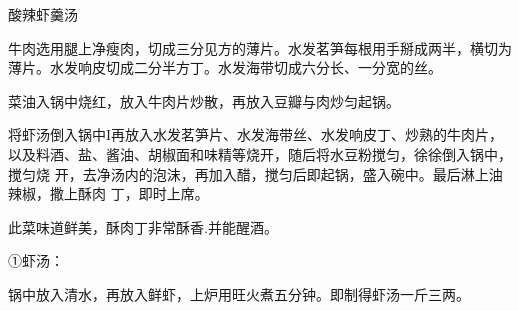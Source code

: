 \begin{recipe}{酸辣虾羹汤}

\ingredients


\cooking

\step 牛肉选用腿上净瘦肉，切成三分见方的薄片。水发茗笋每根用手掰成两半，横切为
薄片。水发响皮切成二分半方丁。水发海带切成六分长、一分宽的丝。

\step 菜油入锅中烧红，放入牛肉片炒散，再放入豆瓣与肉炒匀起锅。

\step 将虾汤倒入锅中I再放入水发茗笋片、水发海带丝、水发响皮丁、炒熟的牛肉片，
以及料酒、盐、酱油、胡椒面和味精等烧开，随后将水豆粉搅匀，徐徐倒入锅中，搅匀烧
开，去净汤内的泡沫，再加入醋，搅匀后即起锅，盛入碗中。最后淋上油辣椒，撒上酥肉
丁，即时上席。

\features

此菜味道鲜美，酥肉丁非常酥香.并能醒酒。

①虾汤：

\ingredients


\cooking

锅中放入清水，再放入鲜虾，上炉用旺火煮五分钟。即制得虾汤一斤三两。

\end{recipe}

